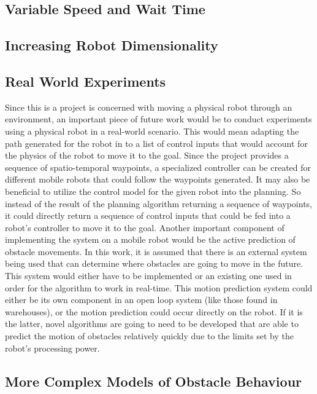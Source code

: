 \subsection{Variable Speed and Wait Time}

\subsection{Increasing Robot Dimensionality}

\subsection{Real World Experiments}

Since this is a project is concerned with moving a physical robot through an
environment, an important piece of future work would be to conduct experiments
using a physical robot in a real-world scenario. This would mean adapting the
path generated for the robot in to a list of control inputs that would account
for the physics of the robot to move it to the goal. Since the project provides
a sequence of spatio-temporal waypoints, a specialized controller can be
created for different mobile robots that could follow the waypoints generated.
It may also be beneficial to utilize the control model for the given robot into
the planning. So instead of the result of the planning algorithm returning a
sequence of waypoints, it could directly return a sequence of control inputs
that could be fed into a robot's controller to move it to the goal. Another
important component of implementing the system on a mobile robot would be the
active prediction of obstacle movements. In this work, it is assumed that there
is an external system being used that can determine where obstacles are going
to move in the future. This system would either have to be implemented or an
existing one used in order for the algorithm to work in real-time. This motion
prediction system could either be its own component in an open loop system
(like those found in warehouses), or the motion prediction could occur directly
on the robot. If it is the latter, novel algorithms are going to need to be
developed that are able to predict the motion of obstacles relatively quickly
due to the limits set by the robot's processing power.

\subsection{More Complex Models of Obstacle Behaviour}

